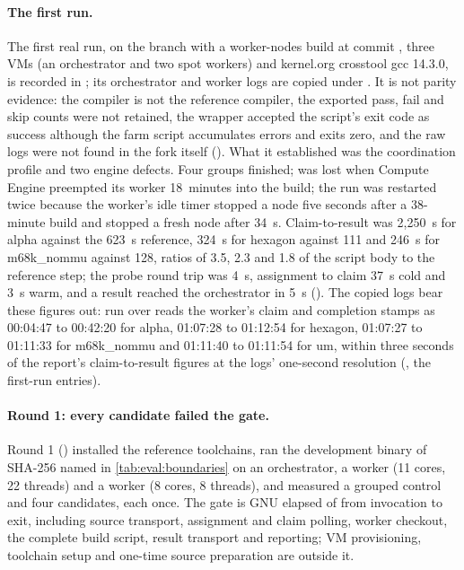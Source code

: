 \paragraph{The first run.}
The first real run, on the  branch with a worker-nodes
build at commit , three VMs (an 
orchestrator and two  spot workers) and kernel.org
crosstool gcc 14.3.0, is recorded in ; its
orchestrator and worker logs are copied under
. It is
not parity evidence: the compiler is not the reference compiler, the exported
pass, fail and skip counts were not retained, the wrapper accepted the
script's exit code as success although the farm script accumulates errors and
exits zero, and the raw logs were not found in the fork itself
(). What it established was the coordination profile
and two engine defects. Four groups finished;  was lost when
Compute Engine preempted its worker 18~minutes into the build; the run was
restarted twice because the worker's idle timer stopped a node five seconds
after a 38-minute build and stopped a fresh node after 34~s. Claim-to-result
was 2,250~s for alpha against the 623~s reference, 324~s for hexagon against
111 and 246~s for m68k\_nommu against 128, ratios of 3.5, 2.3 and 1.8 of the
script body to the reference step; the probe round trip was 4~s, assignment
to claim 37~s cold and 3~s warm, and a result reached the orchestrator in 5~s
(). The copied logs bear these figures out:
 run over  reads the
worker's claim and completion stamps as 00:04:47 to 00:42:20 for alpha,
01:07:28 to 01:12:54 for hexagon, 01:07:27 to 01:11:33 for m68k\_nommu and
01:11:40 to 01:11:54 for um, within three seconds of the report's
claim-to-result figures at the logs' one-second resolution
(, the first-run entries).

\paragraph{Round 1: every candidate failed the gate.}
Round 1 () installed the reference
toolchains, ran the development binary of SHA-256
 named in \cref{tab:eval:boundaries} on an
 orchestrator, a  worker (11 cores,
22 threads) and a  worker (8 cores, 8 threads), and
measured a grouped control and four candidates, each once. The gate is GNU
 elapsed of  from invocation to exit,
including source transport, assignment and claim polling, worker checkout, the
complete build script, result transport and reporting; VM provisioning,
toolchain setup and one-time source preparation are outside it.

